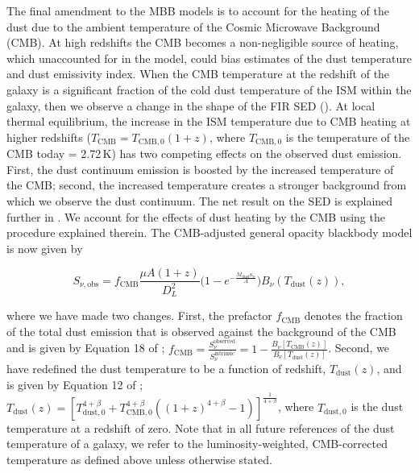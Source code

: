 The final amendment to the MBB models is to account for the heating of the dust due to the ambient temperature of the Cosmic Microwave Background (CMB). At high redshifts the CMB becomes a non-negligible source of heating, which unaccounted for in the model, could bias estimates of the dust temperature and dust emissivity index. When the CMB temperature at the redshift of the galaxy is a significant fraction of the cold dust temperature of the ISM within the galaxy, then we observe a change in the shape of the FIR SED (\citealt{daCunha_2013}). At local thermal equilibrium, the increase in the ISM temperature due to CMB heating at higher redshifts ($T_{\textrm{CMB}} = T_{\textrm{CMB}, 0}(1+z)$, where $T_{\textrm{CMB}, 0}$ is the temperature of the CMB today = 2.72\,K) has two competing effects on the observed dust emission. First, the dust continuum emission is boosted by the increased temperature of the CMB; second, the increased temperature creates a stronger background from which we observe the dust continuum. The net result on the SED is explained further in \citealt{daCunha_2013}. We account for the effects of dust heating by the CMB using the procedure explained therein. The CMB-adjusted general opacity blackbody model is now given by 

\begin{equation}
	S_{\nu, \textrm{obs}} = f_{\textrm{CMB}}\frac{\mu A (1+z)}{D_L^2}\Bigg(1 - e^{- \frac{M_{\textrm{dust}}\kappa_\nu}{A}}\Bigg) B_\nu(T_{\textrm{dust}}(z)),
	\label{eq:modified_blackbody_general_opacity_a_cmb}
\end{equation}

where we have made two changes. First, the prefactor $f_{\textrm{CMB}}$ denotes the fraction of the total dust emission that is observed against the background of the CMB and is given by Equation 18 of \citealt{daCunha_2013}; $f_{\textrm{CMB}} = \frac{S_\nu^{\textrm{observed}}}{S_\nu^{\textrm{intrinsic}}} = 1 - \frac{B_\nu[T_{\textrm{CMB}}(z)]}{B_\nu[T_{\textrm{dust}}(z)]}$. Second, we have redefined the dust temperature to be a function of redshift, $T_{\textrm{dust}}(z)$, and is given by Equation 12 of \citealt{daCunha_2013}; $T_{\textrm{dust}}(z) = [T_{\textrm{dust}, 0}^{4+\beta} + T_{\textrm{CMB}, 0}^{4+\beta} ((1+z)^{4+\beta} - 1)]^{\frac{1}{4+\beta}}$, where $T_{\textrm{dust}, 0}$ is the dust temperature at a redshift of zero. Note that in all future references of the dust temperature of a galaxy, we refer to the luminosity-weighted, CMB-corrected temperature as defined above unless otherwise stated.


